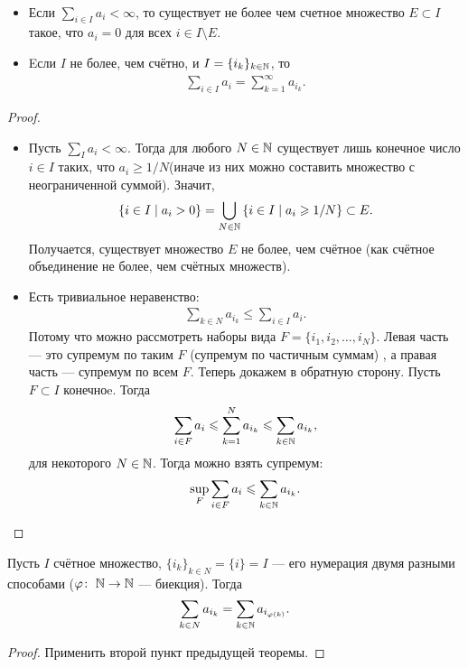 \begin{thm}\
 \begin{itemize}
  \item Если $ \sum_{i \in I} a_i < \infty $, то существует не более чем счетное множество $ E \subset I $ такое, что $ a_i = 0 $ для всех $ i \in I \setminus E $.
  \item Eсли $ I $ не более, чем счётно, и $ I = \{i_k\}_{k \in \mathbb{N}} $, то
   \begin{align*}
    \sum_{i \in I} a_i = \sum_{k=1}^\infty a_{i_k}
   .\end{align*}
 \end{itemize}
\end{thm}
\begin{proof}\
 \begin{itemize}
  \item Пусть $ \sum_I a_i < \infty $. Тогда для любого $ N \in \mathbb{N} $ существует лишь конечное число $ i \in I $ таких, что $ a_i \geqslant 1/N $(иначе из них можно составить множество с неограниченной суммой). Значит,
 \begin{align*}
  \left\{ i \in I \mid a_i > 0 \right\} = \bigcup_{N \in \mathbb{N}} \left\{ i \in I \mid a_i \geqslant 1/N \right\} \subset E
 .\end{align*} Получается, существует множество $ E $ не более, чем счётное (как счётное объединение не более, чем счётных множеств).
\item Есть тривиальное неравенство:
 \begin{align*}
  \sum_{k \in N} a_{i_k} \leqslant \sum_{i \in I} a_i
 .\end{align*} Потому что можно рассмотреть наборы вида $ F = \{i_1, i_2, \ldots, i_N\} $. Левая часть --- это супремум по таким $ F $ (супремум по частичным суммам) , а правая часть --- супремум по всем $ F $. Теперь докажем в обратную сторону. Пусть $ F \subset I $ конечноe. Тогда 
 \begin{align*}
  \sum_{i \in F} a_i \leqslant \sum_{k=1}^N a_{i_k} \leqslant \sum_{k \in \mathbb{N}} a_{i_k}
 ,\end{align*} для некоторого $ N \in \mathbb{N} $. Тогда можно взять супремум:
 \begin{align*}
  \sup_F \sum_{i \in F} a_i \leqslant \sum_{k \in \mathbb{N}} a_{i_k}
 .\end{align*}
 \end{itemize}
\end{proof}
\begin{crly}
 Пусть $ I $ счётное множество, $ \{i_k\}_{k \in N} = \{i\} = I$ --- его нумерация двумя разными способами ($ \varphi \colon\; \mathbb{N} \to \mathbb{N} $ --- биекция). Тогда
 \begin{align*}
  \sum_{k \in N} a_{i_k} = \sum_{k \in \mathbb{N}} a_{i_{\varphi(k)}}
 .\end{align*}
\end{crly}
\begin{proof}
 Применить второй пункт предыдущей теоремы.
\end{proof}

